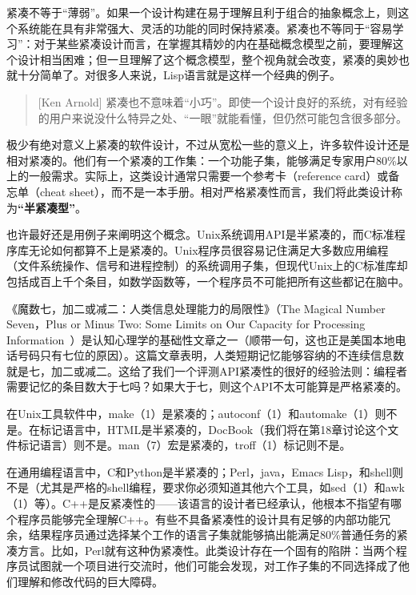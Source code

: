 \documentclass[12pt,oneside]{ctexbook}
\begin{document}
\begin{common-format}
紧凑不等于“薄弱”。如果一个设计构建在易于理解且利于组合的抽象概念上，则这个系统能在具有非常强大、灵活的功能的同时保持紧凑。紧凑也不等同于“容易学习”：对于某些紧凑设计而言，在掌握其精妙的内在基础概念模型之前，要理解这个设计相当困难；但一旦理解了这个概念模型，整个视角就会改变，紧凑的奥妙也就十分简单了。对很多人来说，Lisp语言就是这样一个经典的例子。

\begin{quote}[Ken Arnold]
紧凑也不意味着“小巧”。即使一个设计良好的系统，对有经验的用户来说没什么特异之处、“一眼”就能看懂，但仍然可能包含很多部分。
\end{quote}

极少有绝对意义上紧凑的软件设计，不过从宽松一些的意义上，许多软件设计还是相对紧凑的。他们有一个紧凑的工作集：一个功能子集，能够满足专家用户80\%以上的一般需求。实际上，这类设计通常只需要一个参考卡（reference card）或备忘单（cheat sheet），而不是一本手册。相对严格紧凑性而言，我们将此类设计称为\textbf{“半紧凑型”}。

也许最好还是用例子来阐明这个概念。Unix系统调用API是半紧凑的，而C标准程序库无论如何都算不上是紧凑的。Unix程序员很容易记住满足大多数应用编程（文件系统操作、信号和进程控制）的系统调用子集，但现代Unix上的C标准库却包括成百上千个条目，如数学函数等，一个程序员不可能把所有这些都记在脑中。

《魔数七，加二或减二：人类信息处理能力的局限性》（The Magical Number Seven，Plus or Minus Two: Some Limits on Our Capacity for Processing Information~\cite{Miller}）是认知心理学的基础性文章之一（顺带一句，这也正是美国本地电话号码只有七位的原因）。这篇文章表明，人类短期记忆能够容纳的不连续信息数就是七，加二或减二。这给了我们一个评测API紧凑性的很好的经验法则：编程者需要记忆的条目数大于七吗？如果大于七，则这个API不太可能算是严格紧凑的。

在Unix工具软件中，make（1）是紧凑的；autoconf（1）和automake（1）则不是。在标记语言中，HTML是半紧凑的，DocBook（我们将在第18章讨论这个文件标记语言）则不是。man（7）宏是紧凑的，troff（1）标记则不是。

在通用编程语言中，C和Python是半紧凑的；Perl，java，Emacs Lisp，和shell则不是（尤其是严格的shell编程，要求你必须知道其他六个工具，如sed（1）和awk（1）等）。C++是反紧凑性的——该语言的设计者已经承认，他根本不指望有哪个程序员能够完全理解C++。有些不具备紧凑性的设计具有足够的内部功能冗余，结果程序员通过选择某个工作的语言子集就能够搞出能满足80\%普通任务的紧凑方言。比如，Perl就有这种伪紧凑性。此类设计存在一个固有的陷阱：当两个程序员试图就一个项目进行交流时，他们可能会发现，对工作子集的不同选择成了他们理解和修改代码的巨大障碍。


\end{common-format}
\end{document}
